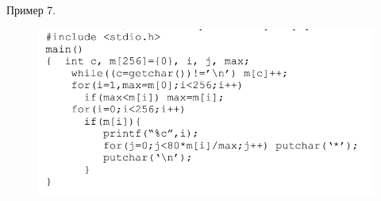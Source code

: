 \documentclass{beamer}
\begin{document}
\begin{frame}
Пример 7. 
\begin{figure}[h]
\centering
\includegraphics[scale=0.5]{images/lec02-pic11.png}
\end{figure}
\end{frame}
\end{document}
